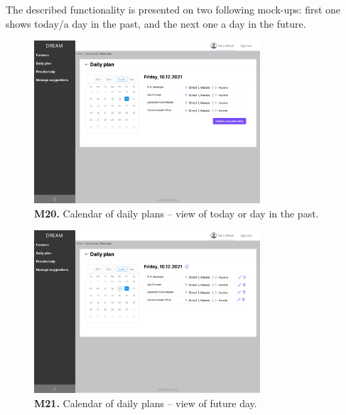     The described functionality is presented on two following mock-ups: first one shows today/a day in the past, and the next one a day in the future.
    \begin{figure}[H]
        \centering
        \includegraphics[width=0.75\textwidth]{mockups/Agronomist_Dashboard_Visit plan.png}
        \caption{\textbf{M20.} Calendar of daily plans – view of today or day in the past.}
    \end{figure}
    
    \begin{figure}[H]
        \centering
        \includegraphics[width=0.75\textwidth]{mockups/Agronomist_Dashboard_Visit plan in future.png}
        \caption{\textbf{M21.} Calendar of daily plans – view of future day.}
    \end{figure}
    
